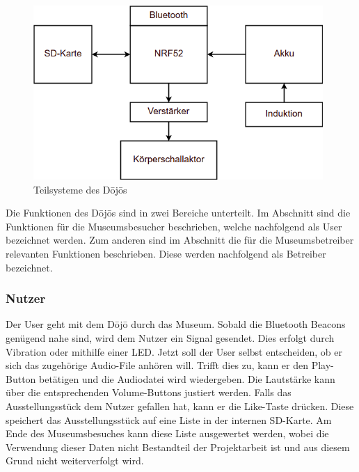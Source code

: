 \begin{figure}[H]
	\begin{center}
		\includegraphics[width=110mm]{data/Loesungskonzept_Teilsysteme.png}
		\caption{Teilsysteme des Dōjōs} %
		\label{fig:Teilsysteme}
	\end{center}
\end{figure}

Die Funktionen des Dōjōs sind in zwei Bereiche unterteilt. Im Abschnitt  sind die Funktionen für die Museumsbesucher beschrieben, welche nachfolgend als User bezeichnet werden. Zum anderen sind im Abschnitt  die für die Museumsbetreiber relevanten Funktionen beschrieben. Diese werden nachfolgend als Betreiber bezeichnet.

\subsubsection*{Nutzer} \label{sec:funktionNutzer}
Der User geht mit dem Dōjō durch das Museum. Sobald die Bluetooth Beacons genügend nahe sind, wird dem Nutzer ein Signal gesendet. Dies erfolgt durch Vibration oder mithilfe einer LED. Jetzt soll der User selbst entscheiden, ob er sich das zugehörige Audio-File anhören will. Trifft dies zu, kann er den Play-Button betätigen und die Audiodatei wird wiedergeben. Die Lautstärke kann über die entsprechenden Volume-Buttons justiert werden. Falls das Ausstellungsstück dem Nutzer gefallen hat, kann er die \glqq Like\grqq-Taste drücken. Diese speichert das Ausstellungsstück auf eine Liste in der internen SD-Karte. Am Ende des Museumsbesuches kann diese Liste ausgewertet werden, wobei die Verwendung dieser Daten nicht Bestandteil der Projektarbeit ist und aus diesem Grund nicht weiterverfolgt wird.

